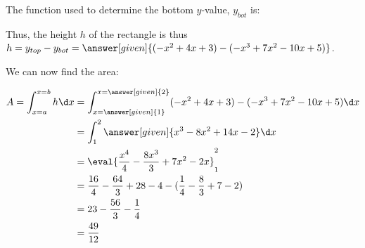 \documentclass{ximera}
\begin{document}
\begin{example}
\begin{explanation}
\begin{question}
The function used to determine the bottom $y$-value, $y_{bot}$ is:
\begin{multipleChoice}
\end{multipleChoice}
\end{question}

Thus, the height $h$ of the rectangle is thus $h=y_{top}-y_{bot} = \answer[given]{(-x^2+4x+3)-(-x^3 + 7x^2-10x+5)}$.
 
We can now find the area:

\begin{align*}
A = \int_{x= a}^{x=b} h \d x &= \int_{x= \answer[given]{1}}^{x= \answer[given]{2}} (-x^2+4x+3)-(-x^3 + 7x^2-10x+5) \d x \\
  &=\int_1^2 \answer[given]{x^3-8x^2+14x-2} \d x \\
  &=\eval{\frac{x^4}{4}-\frac{8x^3}{3}+7x^2-2x}_1^2 \\
  &= \frac{16}{4} - \frac{64}{3}+28-4-(\frac{1}{4}- \frac{8}{3}+7-2) \\
  &=23-\frac{56}{3}-\frac{1}{4}\\
  &=\frac{49}{12}
\end{align*} 
 

\end{explanation}
\end{example}

\end{document}
